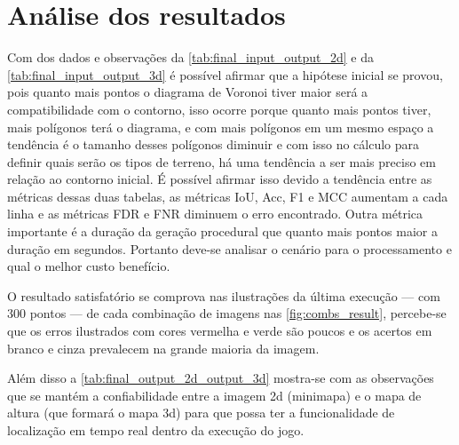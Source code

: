 \section{Análise dos resultados}

Com dos dados e observações da \cref{tab:final_input_output_2d} e da \cref{tab:final_input_output_3d} é possível afirmar que a hipótese inicial se provou, pois quanto mais pontos o diagrama de Voronoi tiver maior será a compatibilidade com o contorno, isso ocorre porque quanto mais pontos tiver, mais polígonos terá o diagrama, e com mais polígonos em um mesmo espaço a tendência é o tamanho desses polígonos diminuir e com isso no cálculo para definir quais serão os tipos de terreno, há uma tendência a ser mais preciso em relação ao contorno inicial. É possível afirmar isso devido a tendência entre as métricas dessas duas tabelas, as métricas IoU, Acc, F1 e MCC aumentam a cada linha e as métricas FDR  e FNR diminuem o erro encontrado. Outra métrica importante é a duração da geração procedural que quanto mais pontos maior a duração em segundos. Portanto deve-se analisar o cenário para o processamento e qual o melhor custo benefício.

O resultado satisfatório se comprova nas ilustrações da última execução — com 300 pontos — de cada combinação de imagens nas \cref{fig:combs_result}, percebe-se que os erros ilustrados com cores vermelha e verde são poucos e os acertos em branco e cinza prevalecem na grande maioria da imagem.

Além disso a \cref{tab:final_output_2d_output_3d} mostra-se com as observações que se mantém a confiabilidade entre a imagem 2d (minimapa) e o mapa de altura (que formará o mapa 3d) para que possa ter a funcionalidade de localização em tempo real dentro da execução do jogo.


